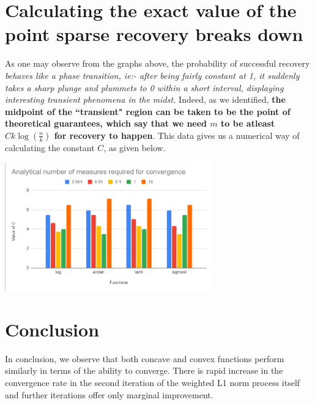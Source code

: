 \documentclass[a4paper,14pt]{article}
\numberwithin{definition}{section}
\numberwithin{mytheorem}{subsection}
\begin{document}










\section{Calculating the exact value of the point sparse recovery breaks down}
As one may observe from the graphs above, the probability of successful recovery \emph{behaves like a phase transition, ie:- after being fairly constant at 1, it suddenly takes a sharp plunge and plummets to 0 within a short interval, displaying interesting transient phenomena in the midst.} Indeed, as we identified, \textbf{the midpoint of the ``transient" region can be taken to be the point of theoretical guarantees, which say that we need $m$ to be atleast $Ck\log (\frac{n}{k})$ for recovery to happen}. This data gives us a numerical way of calculating the constant $C$, as given below.

\begin{center}
    \includegraphics[width=9cm]{constant.png}
\end{center}


\section{Conclusion}

In conclusion, we observe that both concave and convex functions perform similarly in terms of the ability to converge. There is rapid increase in the convergence rate in the second iteration of the weighted L1 norm process itself and further iterations offer only marginal improvement.
\end{document}
